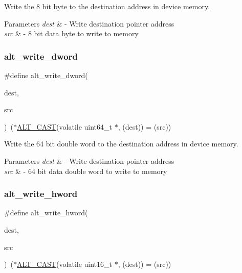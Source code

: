 Write the 8 bit byte to the destination address in device memory. 
\begin{DoxyParams}{Parameters}
{\em dest} & -\/ Write destination pointer address \\
\hline
{\em src} & -\/ 8 bit data byte to write to memory \\
\hline
\end{DoxyParams}
\mbox{\label{group__ALT__SOCAL__UTIL__RW__FUNC_ga0fe80f8e5b6f3f09976dd35df49285e7}} 
\subsubsection{\texorpdfstring{alt\_write\_dword}{alt\_write\_dword}}
{\footnotesize\ttfamily \#define alt\+\_\+write\+\_\+dword(\begin{DoxyParamCaption}\item[{}]{dest,  }\item[{}]{src }\end{DoxyParamCaption})~($\ast$\mbox{\hyperlink{group__ALT__SOCAL__UTIL_ga0c0d803769fc22ce2c319fc475febbde}{A\+L\+T\+\_\+\+C\+A\+ST}}(volatile uint64\+\_\+t $\ast$, (dest)) = (src))}

Write the 64 bit double word to the destination address in device memory. 
\begin{DoxyParams}{Parameters}
{\em dest} & -\/ Write destination pointer address \\
\hline
{\em src} & -\/ 64 bit data double word to write to memory \\
\hline
\end{DoxyParams}
\mbox{\label{group__ALT__SOCAL__UTIL__RW__FUNC_ga68370263143f2bbcae44530837772f50}} 
\subsubsection{\texorpdfstring{alt\_write\_hword}{alt\_write\_hword}}
{\footnotesize\ttfamily \#define alt\+\_\+write\+\_\+hword(\begin{DoxyParamCaption}\item[{}]{dest,  }\item[{}]{src }\end{DoxyParamCaption})~($\ast$\mbox{\hyperlink{group__ALT__SOCAL__UTIL_ga0c0d803769fc22ce2c319fc475febbde}{A\+L\+T\+\_\+\+C\+A\+ST}}(volatile uint16\+\_\+t $\ast$, (dest)) = (src))}

